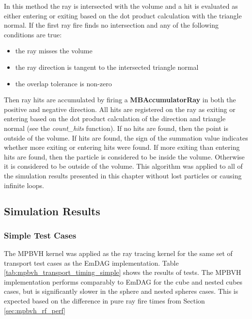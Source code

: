 In this method the ray is intersected with the volume and a hit is evaluated as
either entering or exiting based on the dot product calculation with the
triangle normal. If the first ray fire finds no intersection and any of the
following conditions are true:

 \begin{itemize} 
  \item the ray misses the volume
  \item the ray direction is tangent to the intersected triangle normal
  \item the overlap tolerance is non-zero
 \end{itemize} 

Then ray hits are accumulated by firing a \textbf{MBAccumulatorRay} in both the
positive and negative direction. All hits are registered on the ray as exiting
or entering based on the dot product calculation of the direction and triangle
normal (see the \textit{count\_hits} function). If no hits are found, then the
point is outside of the volume. If hits are found, the sign of the summation
value indicates whether more exiting or entering hits were found. If more
exiting than entering hits are found, then the particle is considered to be
inside the volume. Otherwise it is considered to be outside of the volume. This
algorithm was applied to all of the simulation results presented in this chapter
without lost particles or causing infinite loops.

\subsection{Simulation Results}

\subsubsection{Simple Test Cases}\label{subsec:mpbvh_simple_tests}
The MPBVH kernel was applied as the ray tracing kernel for the same set of
transport test cases as the EmDAG implementation. Table
\ref{tab:mpbvh_transport_timing_simple} shows the results of tests. The MPBVH
implementation performs comparably to EmDAG for the cube and nested cubes cases,
but is significantly slower in the sphere and nested spheres cases. This is
expected based on the difference in pure ray fire times from Section
\ref{sec:mpbvh_rf_perf}

